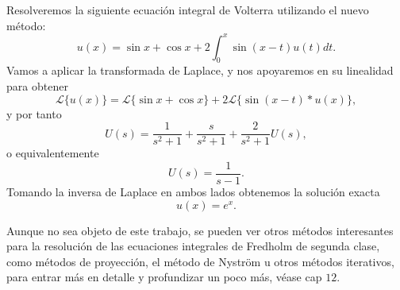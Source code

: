 \begin{ejemplo}
	Resolveremos la siguiente ecuación integral de Volterra utilizando el nuevo método:
	\begin{equation}
		u(x) = \sin x + \cos x + 2 \int_{0}^{x} \sin (x-t)u(t)dt.
	\end{equation}
	Vamos a aplicar la transformada de Laplace, y nos apoyaremos en su linealidad para obtener
	\begin{equation}
		\mathcal{L}\{u(x)\} = \mathcal{L}\{\sin x + \cos x\} + 2\mathcal{L}\{\sin (x-t) \ast u(x)\},
	\end{equation}
	y por tanto
	\begin{equation}
		U(s) = \dfrac{1}{s^2+1}+\dfrac{s}{s^2+1}+\dfrac{2}{s^2+1}U(s),
	\end{equation}
	o equivalentemente
	\begin{equation}
		U(s) = \dfrac{1}{s-1}.
	\end{equation}
	Tomando la inversa de Laplace en ambos lados obtenemos la solución exacta
	\begin{equation}
		u(x) = e^x.
	\end{equation}
\end{ejemplo}

Aunque no sea objeto de este trabajo, se pueden ver otros métodos interesantes para la resolución de las ecuaciones integrales de Fredholm de segunda clase, como métodos de proyección, el método de Nyström u otros métodos iterativos, para entrar más en detalle y profundizar un poco más, véase \cite{Atkinson} cap $12$.

\endinput
